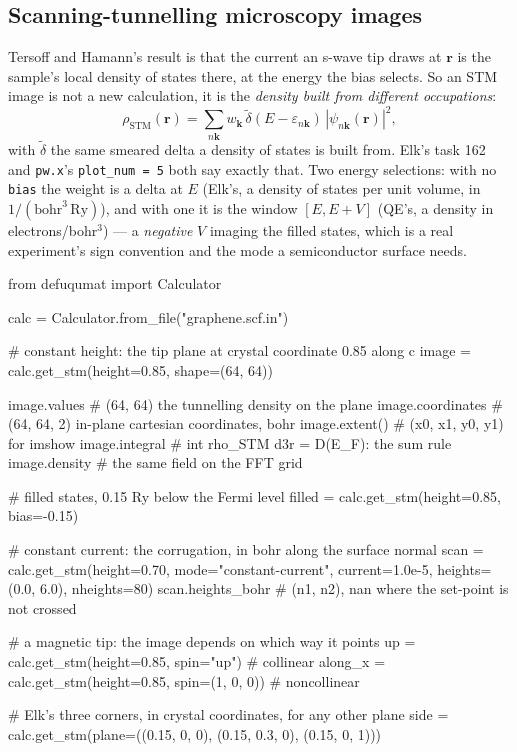 \documentclass[11pt,a4paper]{article}
\newcommand{\code}[1]{\texttt{\small #1}}
\begin{document}
\subsection{Scanning-tunnelling microscopy images}

Tersoff and Hamann's result is that the current an s-wave tip draws at
$\mathbf r$ is the sample's local density of states there, at the energy the
bias selects. So an STM image is not a new calculation, it is the
\emph{density built from different occupations}:
\begin{equation*}
  \rho_{\mathrm{STM}}(\mathbf r)
   = \sum_{n\mathbf k} w_{\mathbf k}\,
     \tilde\delta(E - \varepsilon_{n\mathbf k})\,
     |\psi_{n\mathbf k}(\mathbf r)|^2 ,
\end{equation*}
with $\tilde\delta$ the same smeared delta a density of states is built from.
Elk's task 162 and \code{pw.x}'s \code{plot\_num = 5} both say exactly that.
Two energy selections: with no \code{bias} the weight is a delta at $E$ (Elk's,
a density of states per unit volume, in $1/(\mathrm{bohr}^3\,\mathrm{Ry})$),
and with one it is the window $[E, E+V]$ (QE's, a density in
electrons/bohr$^3$) --- a \emph{negative} $V$ imaging the filled states, which
is a real experiment's sign convention and the mode a semiconductor surface
needs.

\begin{pycode}
from defuqumat import Calculator

calc = Calculator.from_file("graphene.scf.in")

# constant height: the tip plane at crystal coordinate 0.85 along c
image = calc.get_stm(height=0.85, shape=(64, 64))

image.values        # (64, 64) the tunnelling density on the plane
image.coordinates   # (64, 64, 2) in-plane cartesian coordinates, bohr
image.extent()      # (x0, x1, y0, y1) for imshow
image.integral      # int rho_STM d3r = D(E_F): the sum rule
image.density       # the same field on the FFT grid

# filled states, 0.15 Ry below the Fermi level
filled = calc.get_stm(height=0.85, bias=-0.15)

# constant current: the corrugation, in bohr along the surface normal
scan = calc.get_stm(height=0.70, mode="constant-current",
                    current=1.0e-5, heights=(0.0, 6.0), nheights=80)
scan.heights_bohr   # (n1, n2), nan where the set-point is not crossed

# a magnetic tip: the image depends on which way it points
up = calc.get_stm(height=0.85, spin="up")            # collinear
along_x = calc.get_stm(height=0.85, spin=(1, 0, 0))  # noncollinear

# Elk's three corners, in crystal coordinates, for any other plane
side = calc.get_stm(plane=((0.15, 0, 0), (0.15, 0.3, 0), (0.15, 0, 1)))
\end{pycode}
\end{document}
